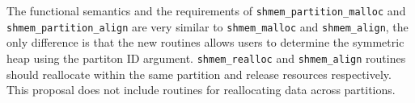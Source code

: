 The functional semantics and the requirements of
\texttt{shmem\_partition\_malloc} and \texttt{shmem\_partition\_align}
are very similar to \texttt{shmem\_malloc} and \texttt{shmem\_align},
the only difference is that the new routines allows users to determine
the symmetric heap using the partiton ID argument. %
\texttt{shmem\_realloc} and \texttt{shmem\_align} routines should
reallocate within the same partition and release resources respectively.
This proposal does not include routines for reallocating data across
partitions.
